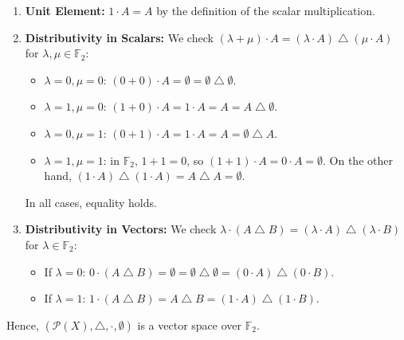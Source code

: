 \begin{exercisesolution}
\begin{enumerate}[label=(\textbf{V}\arabic*), leftmargin=3.5em]
    \item \textbf{Unit Element:}
    $1 \cdot A = A$ by the definition of the scalar multiplication.

    \item \textbf{Distributivity in Scalars:}
    We check $(\lambda + \mu) \cdot A = (\lambda \cdot A) \mathbin{\triangle} (\mu \cdot A)$ for $\lambda, \mu \in \mathbb{F}_2$:
    \begin{itemize}
        \item $\lambda = 0, \mu = 0$: $(0+0)\cdot A = \emptyset = \emptyset \mathbin{\triangle} \emptyset$.
        \item $\lambda = 1, \mu = 0$: $(1+0)\cdot A = 1\cdot A = A = A \mathbin{\triangle} \emptyset$.
        \item $\lambda = 0, \mu = 1$: $(0+1)\cdot A = 1\cdot A = A = \emptyset \mathbin{\triangle} A$.
        \item $\lambda = 1, \mu = 1$: in $\mathbb{F}_2$, $1 + 1 = 0$, so $(1+1)\cdot A = 0 \cdot A = \emptyset$. On the other hand, $(1\cdot A) \mathbin{\triangle} (1\cdot A) = A \mathbin{\triangle} A = \emptyset$.
    \end{itemize}
    In all cases, equality holds.

    \item \textbf{Distributivity in Vectors:}
    We check $\lambda \cdot (A \mathbin{\triangle} B) = (\lambda \cdot A) \mathbin{\triangle} (\lambda \cdot B)$ for $\lambda \in \mathbb{F}_2$:
    \begin{itemize}
        \item If $\lambda = 0$: $0 \cdot (A \mathbin{\triangle} B) = \emptyset = \emptyset \mathbin{\triangle} \emptyset = (0 \cdot A) \mathbin{\triangle} (0 \cdot B)$.
        \item If $\lambda = 1$: $1 \cdot (A \mathbin{\triangle} B) = A \mathbin{\triangle} B = (1 \cdot A) \mathbin{\triangle} (1 \cdot B)$.
    \end{itemize}
\end{enumerate}
Hence, $(\mathcal{P}(X), \bigtriangleup, \cdot, \emptyset)$ is a vector space over $\mathbb{F}_2$.
\end{exercisesolution}
